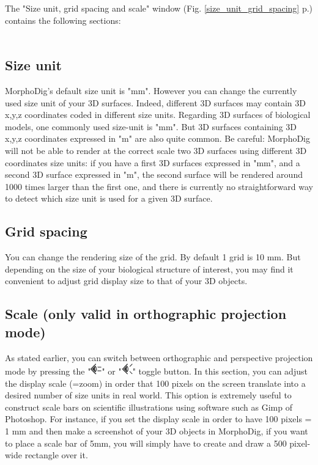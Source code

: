 \noindent The "Size unit, grid spacing and scale" window (Fig. \ref{size_unit_grid_spacing} p.\pageref{size_unit_grid_spacing}) contains the following sections:\\\\
\subsection{Size unit}
\noindent MorphoDig's default size unit is "mm". 
However you can change the currently used size unit of your 3D surfaces. Indeed, different 3D surfaces may contain 3D x,y,z coordinates coded in different size units. Regarding 3D surfaces of biological models, one commonly used size-unit is  "mm". But 3D surfaces containing 3D x,y,z coordinates expressed in "\si{\micro}m" are also quite common. Be careful: MorphoDig will not be able to render at the correct scale two 3D surfaces using different 3D coordinates size units: if you have a first 3D surfaces expressed in "mm", and a second 3D surface expressed in "\si{\micro}m", the second surface will be rendered around 1000 times larger than the first one, and there is currently no straightforward way to detect which size unit is used for a given 3D surface. 


\subsection{Grid spacing}
\noindent You can change the rendering size of the grid. By default 1 grid is 10 mm. But depending on the size of your biological structure of interest, you may find it convenient to adjust grid display size to that of your 3D objects. 

\subsection{Scale (only valid in orthographic projection mode)}
\noindent As stated earlier, you can switch between orthographic and perspective projection mode by pressing the "\includegraphics[scale=0.7]{images/06/camera/camera_ortho.png}" or "\includegraphics[scale=0.7]{images/06/camera/camera_persp}" toggle button. In this section, you can adjust the display scale (=zoom) in order that 100 pixels on the screen translate into a desired number of size units in real world. This option is extremely useful to construct scale bars on scientific illustrations using software such as Gimp of Photoshop. For instance, if you set the display scale in order to have 100 pixels = 1 mm and then make a screenshot of your 3D objects in MorphoDig, if you want to place a scale bar of 5mm, you will simply have to create and draw a 500 pixel-wide rectangle over it. 




